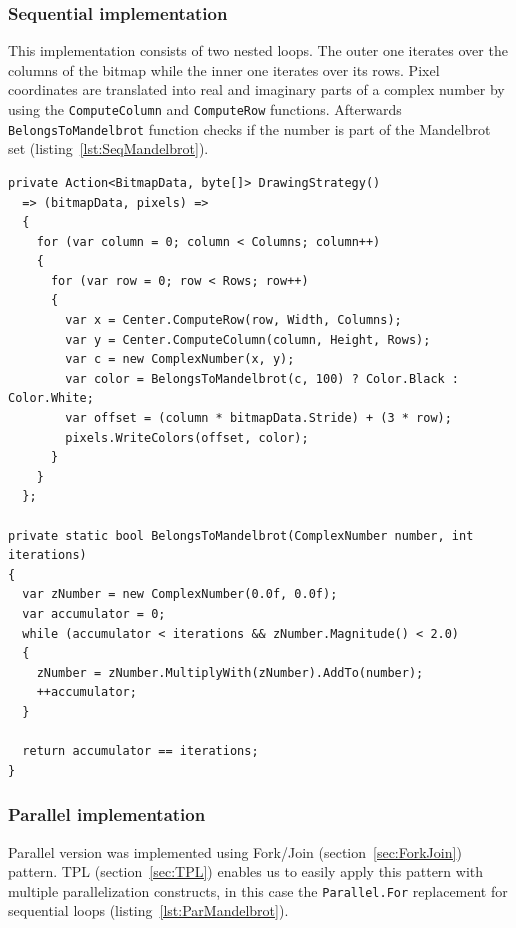 \pagebreak
\subsubsection{Sequential implementation}
This implementation consists of two nested loops. The outer one iterates over the columns of the bitmap while the inner one iterates over its rows. 
Pixel coordinates are translated into real and imaginary parts of a complex number by using the \texttt{ComputeColumn} and \texttt{ComputeRow} functions. Afterwards \texttt{BelongsToMandelbrot} function checks if the number is part of the Mandelbrot set (listing~\ref{lst:SeqMandelbrot}).

\begin{lstlisting}[style=sharpcstyle, caption={Sequential \texttt{Mandelbrot} algorithm}, label={lst:SeqMandelbrot},
numbers=none, xleftmargin=0pt,framexleftmargin=0pt,framexrightmargin=0pt,framexbottommargin=0pt]
private Action<BitmapData, byte[]> DrawingStrategy()
  => (bitmapData, pixels) =>
  {
    for (var column = 0; column < Columns; column++) 
    {
      for (var row = 0; row < Rows; row++) 
      {
        var x = Center.ComputeRow(row, Width, Columns); 
        var y = Center.ComputeColumn(column, Height, Rows); 
        var c = new ComplexNumber(x, y);
        var color = BelongsToMandelbrot(c, 100) ? Color.Black : Color.White; 
        var offset = (column * bitmapData.Stride) + (3 * row);
        pixels.WriteColors(offset, color);
      }
    }
  };

private static bool BelongsToMandelbrot(ComplexNumber number, int iterations)
{
  var zNumber = new ComplexNumber(0.0f, 0.0f);
  var accumulator = 0;
  while (accumulator < iterations && zNumber.Magnitude() < 2.0)
  {
    zNumber = zNumber.MultiplyWith(zNumber).AddTo(number);
    ++accumulator;
  }

  return accumulator == iterations;
}
\end{lstlisting}

\subsubsection{Parallel implementation}
Parallel version was implemented using Fork/Join (section~\ref{sec:ForkJoin}) pattern. TPL (section~\ref{sec:TPL})  enables us to easily apply this pattern with multiple parallelization constructs, in this case the \texttt{Parallel.For} replacement for sequential loops (listing~\ref{lst:ParMandelbrot}).

